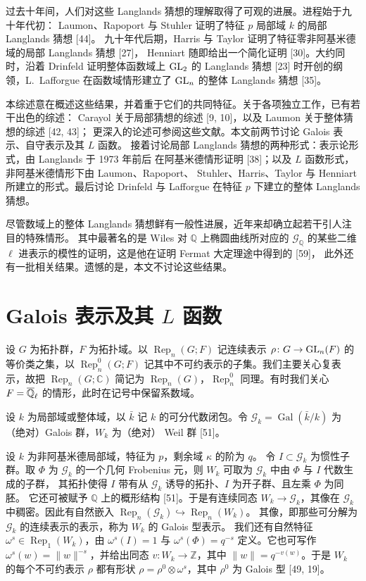 过去十年间，人们对这些 Langlands 猜想的理解取得了可观的进展。进程始于九十年代初：
Laumon、Rapoport 与 Stuhler 证明了特征 $p$ 局部域 $k$ 的局部 Langlands 猜想 [44]。
九十年代后期，Harris 与 Taylor 证明了特征零非阿基米德域的局部 Langlands 猜想 [27]，
Henniart 随即给出一个简化证明 [30]。大约同时，沿着 Drinfeld 证明整体函数域上
$\mathrm{GL}_2$ 的 Langlands 猜想 [23] 时开创的纲领，L.~Lafforgue 在函数域情形建立了
$\mathrm{GL}_n$ 的整体 Langlands 猜想 [35]。

本综述意在概述这些结果，并着重于它们的共同特征。关于各项独立工作，已有若干出色的综述：
Carayol 关于局部猜想的综述 [9, 10]，以及 Laumon 关于整体猜想的综述 [42, 43]；
更深入的论述可参阅这些文献。本文前两节讨论 Galois 表示、自守表示及其 $L$ 函数。
接着讨论局部 Langlands 猜想的两种形式：表示论形式，由 Langlands 于 1973 年前后
在阿基米德情形证明 [38]；以及 $L$ 函数形式，非阿基米德情形下由 Laumon、Rapoport、
Stuhler、Harris、Taylor 与 Henniart 所建立的形式。最后讨论 Drinfeld 与 Lafforgue
在特征 $p$ 下建立的整体 Langlands 猜想。

尽管数域上的整体 Langlands 猜想鲜有一般性进展，近年来却确立起若干引人注目的特殊情形。
其中最著名的是 Wiles 对 $\mathbb{Q}$ 上椭圆曲线所对应的 $\mathcal{G}_{\mathbb{Q}}$
的某些二维 $\ell$ 进表示的模性的证明，这是他在证明 Fermat 大定理途中得到的 [59]，
此外还有一批相关结果。遗憾的是，本文不讨论这些结果。

\section{Galois 表示及其 \texorpdfstring{$L$}{L} 函数}

设 $G$ 为拓扑群，$F$ 为拓扑域。以 $\operatorname{Rep}_n(G;F)$ 记连续表示
$\rho\colon G\to\mathrm{GL}_n(F)$ 的等价类之集，以 $\operatorname{Rep}_n^0(G;F)$
记其中不可约表示的子集。我们主要关心复表示，故把 $\operatorname{Rep}_n(G;\mathbb{C})$
简记为 $\operatorname{Rep}_n(G)$，$\operatorname{Rep}_n^0$ 同理。有时我们关心
$F=\overline{\mathbb{Q}}_\ell$ 的情形，此时在记号中保留系数域。

设 $k$ 为局部域或整体域，以 $\bar k$ 记 $k$ 的可分代数闭包。令
$\mathcal{G}_k=\operatorname{Gal}(\bar k/k)$ 为（绝对）Galois 群，$W_k$ 为（绝对）
Weil 群 [51]。

设 $k$ 为非阿基米德局部域，特征为 $p$，剩余域 $\kappa$ 的阶为 $q$。
令 $I\subset\mathcal{G}_k$ 为惯性子群。取 $\Phi$ 为 $\mathcal{G}_k$ 的一个几何
Frobenius 元，则 $W_k$ 可取为 $\mathcal{G}_k$ 中由 $\Phi$ 与 $I$ 代数生成的子群，
其拓扑使得 $I$ 带有从 $\mathcal{G}_k$ 诱导的拓扑、$I$ 为开子群、且左乘 $\Phi$ 为同胚。
它还可被赋予 $\mathbb{Q}$ 上的概形结构 [51]。于是有连续同态
$W_k\to\mathcal{G}_k$，其像在 $\mathcal{G}_k$ 中稠密。因此有自然嵌入
$\operatorname{Rep}_n(\mathcal{G}_k)\hookrightarrow\operatorname{Rep}_n(W_k)$。
其像，即那些可分解为 $\mathcal{G}_k$ 的连续表示的表示，称为 $W_k$ 的 Galois 型表示。
我们还有自然特征 $\omega^s\in\operatorname{Rep}_1(W_k)$，由 $\omega^s(I)=1$ 与
$\omega^s(\Phi)=q^{-s}$ 定义。它也可写作 $\omega^s(w)=\|w\|^{-s}$，并给出同态
$v\colon W_k\to\mathbb{Z}$，其中 $\|w\|=q^{-v(w)}$。于是 $W_k$ 的每个不可约表示
$\rho$ 都有形状 $\rho=\rho^0\otimes\omega^s$，其中 $\rho^0$ 为 Galois 型 [49, 19]。

